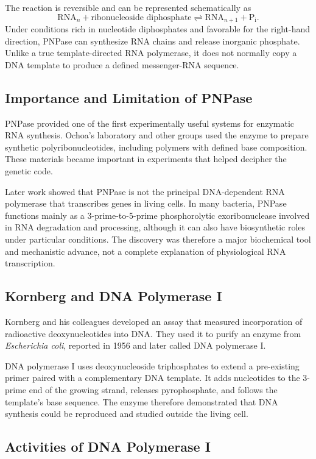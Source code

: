 The reaction is reversible and can be represented schematically as
\[
\text{RNA}_{n} + \text{ribonucleoside diphosphate} \rightleftharpoons \text{RNA}_{n+1} + \text{P}_{\mathrm{i}}.
\]
Under conditions rich in nucleotide diphosphates and favorable for the right-hand direction, PNPase can synthesize RNA chains and release inorganic phosphate. Unlike a true template-directed RNA polymerase, it does not normally copy a DNA template to produce a defined messenger-RNA sequence.

\subsection{Importance and Limitation of PNPase}

PNPase provided one of the first experimentally useful systems for enzymatic RNA synthesis. Ochoa's laboratory and other groups used the enzyme to prepare synthetic polyribonucleotides, including polymers with defined base composition. These materials became important in experiments that helped decipher the genetic code.

Later work showed that PNPase is not the principal DNA-dependent RNA polymerase that transcribes genes in living cells. In many bacteria, PNPase functions mainly as a 3-prime-to-5-prime phosphorolytic exoribonuclease involved in RNA degradation and processing, although it can also have biosynthetic roles under particular conditions. The discovery was therefore a major biochemical tool and mechanistic advance, not a complete explanation of physiological RNA transcription.

\subsection{Kornberg and DNA Polymerase I}

Kornberg and his colleagues developed an assay that measured incorporation of radioactive deoxynucleotides into DNA. They used it to purify an enzyme from \textit{Escherichia coli}, reported in 1956 and later called DNA polymerase I.

DNA polymerase I uses deoxynucleoside triphosphates to extend a pre-existing primer paired with a complementary DNA template. It adds nucleotides to the 3-prime end of the growing strand, releases pyrophosphate, and follows the template's base sequence. The enzyme therefore demonstrated that DNA synthesis could be reproduced and studied outside the living cell.

\subsection{Activities of DNA Polymerase I}

